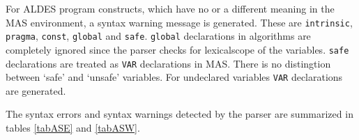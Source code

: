 For ALDES program constructs, which have no or a different
meaning in the MAS environment, a syntax warning message is generated.
These are \verb/intrinsic/, \verb/pragma/, \verb/const/, 
\verb/global/ and \verb/safe/.
\verb/global/ declarations in algorithms are completely ignored 
since the parser checks for lexicalscope of the variables.
\verb/safe/ declarations are treated as \verb/VAR/ declarations 
in MAS. There is no distingtion between `safe' and `unsafe' 
variables.  For undeclared variables \verb/VAR/ declarations 
are generated.

The syntax errors and syntax warnings detected by the parser 
are summarized in tables \ref{tabASE} and \ref{tabASW}.

